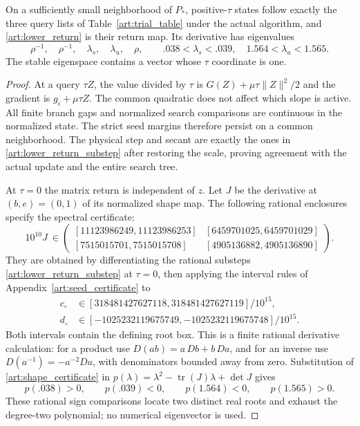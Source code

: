 \begin{lemma}\label{art:lower_hyperbolic}
On a sufficiently small neighborhood of $P_*$, positive-$\tau$ states
follow exactly the three query lists of Table~\ref{art:trial_table} under
the actual algorithm, and \eqref{art:lower_return} is their return map.
Its derivative has eigenvalues
\[
 \rho^{-1},\quad\rho^{-1},\quad\lambda_s,\quad\lambda_u,\quad\rho,
 \qquad .038<\lambda_s<.039,\quad1.564<\lambda_u<1.565.
\]
The stable eigenspace contains a vector whose $\tau$ coordinate is one.
\end{lemma}
\begin{proof}
At a query $\tau Z$, the value divided by $\tau$ is
$G(Z)+\mu\tau\|Z\|^2/2$ and the gradient is $g_i+\mu\tau Z$.
The common quadratic does not affect which slope is active. All finite
branch gaps and normalized search comparisons are continuous in the
normalized state. The strict seed margins therefore persist on a common
neighborhood. The physical step and secant are exactly the ones in
\eqref{art:lower_return_substep} after restoring the scale, proving
agreement with the actual update and the entire search tree.

At $\tau=0$ the matrix return is independent of $z$. Let $J$ be the
derivative at $(b,e)=(0,1)$ of its normalized shape map.
The following rational enclosures specify the spectral certificate:
\begin{equation}\label{art:shape_certificate}
 10^{10}J\ \in
 \begin{pmatrix}
 [11123986249,11123986253]&[6459701025,6459701029]\\
 [7515015701,7515015708]&[4905136882,4905136890]
 \end{pmatrix}.
\end{equation}
They are obtained by differentiating the rational substeps
\eqref{art:lower_return_substep} at $\tau=0$, then applying the interval
rules of Appendix~\ref{art:seed_certificate} to
\begin{align*}
 c_\circ&\in[318481427627118,318481427627119]/10^{15},\\
 d_\circ&\in[-1025232119675749,-1025232119675748]/10^{15}.
\end{align*}
Both intervals contain the defining root box. This is a finite rational
derivative calculation: for a product use
$D(ab)=a\,Db+b\,Da$, and for an inverse use
$D(a^{-1})=-a^{-2}Da$, with denominators bounded away from zero.
Substitution of \eqref{art:shape_certificate} in
$p(\lambda)=\lambda^2-\operatorname{tr}(J)\lambda+\det J$ gives
\[
 p(.038)>0,\qquad p(.039)<0,\qquad
 p(1.564)<0,\qquad p(1.565)>0.
\]
These rational sign comparisons locate two distinct real roots and exhaust
the degree-two polynomial; no numerical eigenvector is used.


\end{proof}
